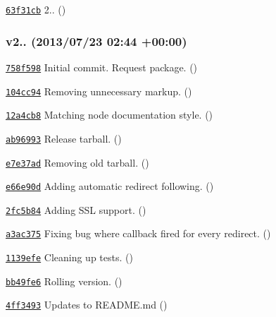 \begin{DoxyItemize}
\item \href{https://github.com/mikeal/request/commit/63f31cb1d170a4af498fbdd7566f867423caf8e3}{\tt 63f31cb} 2.. ()
\end{DoxyItemize}

\subsubsection*{v2.. (2013/07/23 02\+:44 +00\+:00)}


\begin{DoxyItemize}
\item \href{https://github.com/mikeal/request/commit/758f598de8d6024db3fa8ee7d0a1fc3e45c50f53}{\tt 758f598} Initial commit. Request package. ()
\item \href{https://github.com/mikeal/request/commit/104cc94839d4b71aaf3681142daefba7ace78c94}{\tt 104cc94} Removing unnecessary markup. ()
\item \href{https://github.com/mikeal/request/commit/12a4cb88b949cb4a81d51189d432c25c08522a87}{\tt 12a4cb8} Matching node documentation style. ()
\item \href{https://github.com/mikeal/request/commit/ab969931106b10b5f8658dc9e0f512c5dfc2a7da}{\tt ab96993} Release tarball. ()
\item \href{https://github.com/mikeal/request/commit/e7e37ad537081a040ea3e527aac23ae859b40b2c}{\tt e7e37ad} Removing old tarball. ()
\item \href{https://github.com/mikeal/request/commit/e66e90dd814ae7bfbcd52003609d7bde9eafea57}{\tt e66e90d} Adding automatic redirect following. ()
\item \href{https://github.com/mikeal/request/commit/2fc5b84832ae42f6ddb081b1909d0a6ca00c8d51}{\tt 2fc5b84} Adding S\+S\+L support. ()
\item \href{https://github.com/mikeal/request/commit/a3ac375d4b5800a038ae26233425fadc26866fbc}{\tt a3ac375} Fixing bug where callback fired for every redirect. ()
\item \href{https://github.com/mikeal/request/commit/1139efedb5aad4a328c1d8ff45fe77839a69169f}{\tt 1139efe} Cleaning up tests. ()
\item \href{https://github.com/mikeal/request/commit/bb49fe6709fa06257f4b7aadc2e450fd45a41328}{\tt bb49fe6} Rolling version. ()
\item \href{https://github.com/mikeal/request/commit/4ff349371931ec837339aa9082c4ac7ddd4c7c35}{\tt 4ff3493} Updates to R\+E\+A\+D\+M\+E.\+md ()

\end{DoxyItemize}
